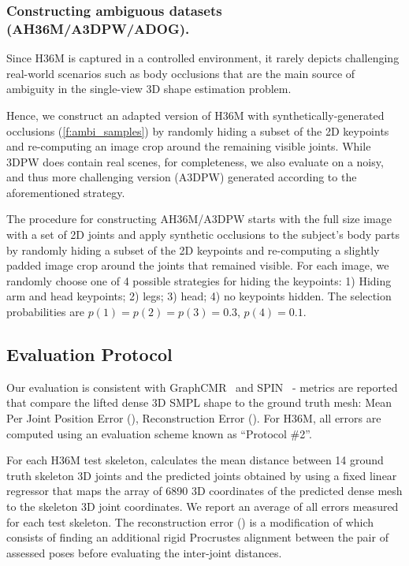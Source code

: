 \subsubsection{Constructing ambiguous datasets (AH36M/A3DPW/ADOG).}
Since H36M is captured in a controlled environment, it rarely depicts challenging real-world scenarios such as body occlusions that are the main source of ambiguity in the single-view 3D shape estimation problem. 

Hence, we construct an adapted version of H36M with synthetically-generated occlusions (\cref{f:ambi_samples}) by randomly hiding a subset of the 2D keypoints and re-computing an image crop around the remaining visible joints. While 3DPW does contain real scenes, for completeness, we also evaluate on a noisy, and thus more challenging version (A3DPW) generated according to the aforementioned strategy. 

The procedure for constructing AH36M/A3DPW starts with the full size image with a set of 2D joints and apply synthetic occlusions to the subject's body parts by randomly hiding a subset of the 2D keypoints and re-computing a slightly padded image crop around the joints that remained visible. 
For each image, we randomly choose one of 4 possible strategies for hiding the keypoints: 1) Hiding arm and head keypoints; 2) legs; 3) head; 4) no keypoints hidden. The selection probabilities are $p(1)=p(2)=p(3)=0.3$, $p(4)=0.1$.




\subsection{Evaluation Protocol}

Our evaluation is consistent with GraphCMR~\cite{kolotouros19learning} and SPIN~\cite{kolotouros19convolutional} - metrics are reported that compare the lifted dense 3D SMPL shape to the ground truth mesh: Mean Per Joint Position Error (\textbf{\MPJPE}), Reconstruction Error (\textbf{\RE}). 
For H36M, all errors are computed using an evaluation scheme known as ``Protocol \#2''. 

For each H36M test skeleton, \MPJPE calculates the mean distance between 14 ground truth skeleton 3D joints and the predicted joints obtained by using a fixed linear regressor that maps the array of 6890 3D coordinates of the predicted dense mesh to the skeleton 3D joint coordinates.
We report an average of all \MPJPE errors measured for each test skeleton.
The reconstruction error (\RE) is a modification of \MPJPE which consists of finding an additional rigid Procrustes alignment between the pair of assessed poses before evaluating the inter-joint distances.


